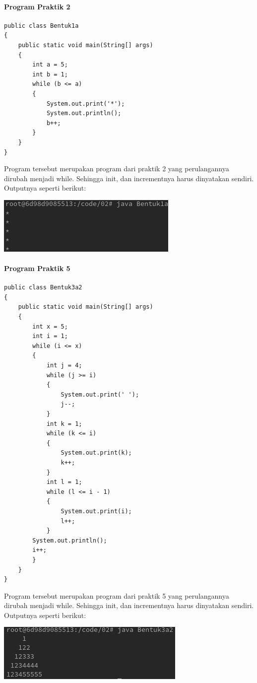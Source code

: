 \documentclass[a4paper,12pt]{article}
\begin{document}
\paragraph{Program Praktik 2\\}
\begin{center}
\begin{lstlisting}
public class Bentuk1a
{
    public static void main(String[] args)
    {
        int a = 5;
        int b = 1;
        while (b <= a)
        {
            System.out.print('*');
            System.out.println();
            b++;
        }
    }
}
\end{lstlisting}
\end{center}
Program tersebut merupakan program dari praktik 2 yang perulangannya dirubah menjadi while. Sehingga init, dan incrementnya harus dinyatakan sendiri.
Outputnya seperti berikut:\\
\begin{center}
    \includegraphics[scale=.7]{7.png}
\end{center}

\paragraph{Program Praktik 5}
\begin{center}
    \begin{lstlisting}
public class Bentuk3a2
{
    public static void main(String[] args)
    {
        int x = 5;
        int i = 1;
        while (i <= x)
        {
            int j = 4;
            while (j >= i)
            {
                System.out.print(' ');
                j--;
            }
            int k = 1;
            while (k <= i)
            {
                System.out.print(k);
                k++;
            }
            int l = 1;
            while (l <= i - 1)
            {
                System.out.print(i);
                l++;
            }
        System.out.println();
        i++;
        }
    }
}
    \end{lstlisting}
\end{center}
Program tersebut merupakan program dari praktik 5 yang perulangannya dirubah menjadi while. Sehingga init, dan incrementnya harus dinyatakan sendiri.
Outputnya seperti berikut:\\
\begin{center}
    \includegraphics[scale=.7]{8.png}
\end{center}
\end{document}
